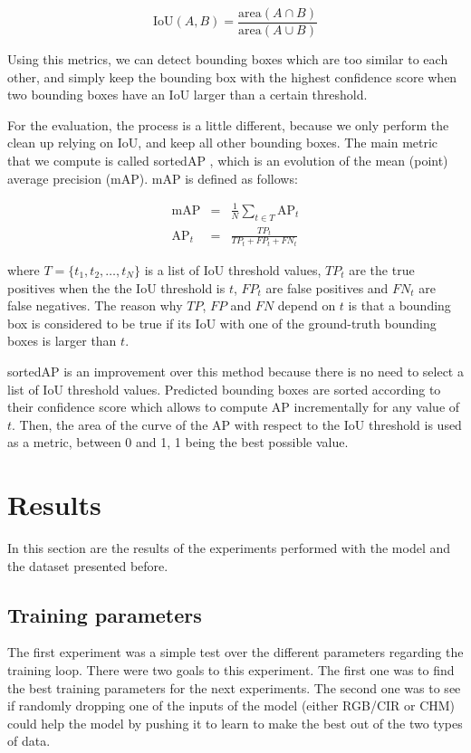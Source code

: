 \documentclass[
  letterpaper,
  DIV=11,
  numbers=noendperiod]{scrartcl}
\begin{document}
\[
\text{IoU}(A, B) = \frac{\text{area}(A \cap B)}{\text{area}(A \cup B)}
\]

Using this metrics, we can detect bounding boxes which are too similar
to each other, and simply keep the bounding box with the highest
confidence score when two bounding boxes have an IoU larger than a
certain threshold.

For the evaluation, the process is a little different, because we only
perform the clean up relying on IoU, and keep all other bounding boxes.
The main metric that we compute is called sortedAP \autocite{sortedAP},
which is an evolution of the mean (point) average precision (mAP). mAP
is defined as follows:

\[
\begin{array}{rcl}
\text{mAP} & = & \frac{1}{N} \sum\limits_{t\in T} \text{AP}_t \\
\text{AP}_t & = & \frac{{TP}_t}{{TP}_t + {FP}_t + {FN}_t}
\end{array}
\]

where \(T=\{t_1, t_2, \dots, t_N\}\) is a list of IoU threshold values,
\({TP}_t\) are the true positives when the the IoU threshold is \(t\),
\({FP}_t\) are false positives and \({FN}_t\) are false negatives. The
reason why \(TP\), \(FP\) and \(FN\) depend on \(t\) is that a bounding
box is considered to be true if its IoU with one of the ground-truth
bounding boxes is larger than \(t\).

sortedAP is an improvement over this method because there is no need to
select a list of IoU threshold values. Predicted bounding boxes are
sorted according to their confidence score which allows to compute
\(\text{AP}\) incrementally for any value of \(t\). Then, the area of
the curve of the AP with respect to the IoU threshold is used as a
metric, between 0 and 1, 1 being the best possible value.

\section{Results}\label{results}

In this section are the results of the experiments performed with the
model and the dataset presented before.

\subsection{Training parameters}\label{training-parameters}

The first experiment was a simple test over the different parameters
regarding the training loop. There were two goals to this experiment.
The first one was to find the best training parameters for the next
experiments. The second one was to see if randomly dropping one of the
inputs of the model (either RGB/CIR or CHM) could help the model by
pushing it to learn to make the best out of the two types of data.
\end{document}
